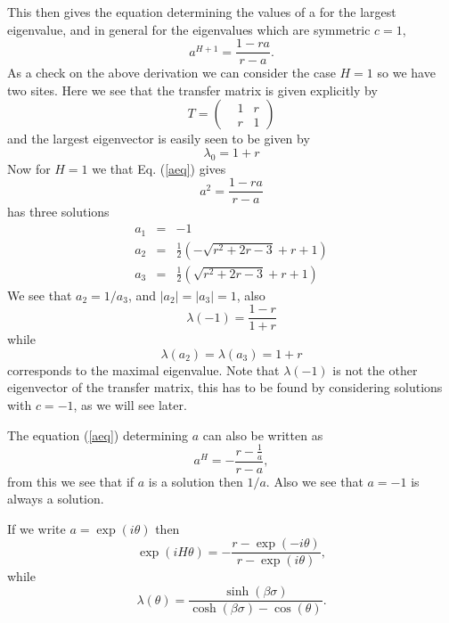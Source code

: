 This then gives the equation determining the values of a for the largest eigenvalue, and in general for the eigenvalues which are symmetric $c=1$,
\begin{equation}
    a^{H+1} =  \frac{1-ra}{r-a}.
    \label{aeq}
\end{equation}
As a check on the above derivation we can consider the case $H=1$ so we have two sites. Here we see that the transfer matrix is given explicitly by
\begin{equation}
    T =\begin{pmatrix} & 1 & r\\& r &1\end{pmatrix}
\end{equation}
and the largest eigenvector is easily seen to be given by
\begin{equation}
    \lambda_0 = 1+r 
\end{equation}
Now for $H=1$ we that Eq. (\ref{aeq}) gives
\begin{equation}
    a^{2} =  \frac{1-ra}{r-a}
\end{equation}
has three solutions
\begin{eqnarray}
a_1&=& -1\\
a_2&=& \frac{1}{2} \left(-\sqrt{r^2+2
   r-3}+r+1\right)    \\
a_3&=& \frac{1}{2} \left(\sqrt{r^2+2
   r-3}+r+1\right)\end{eqnarray}
We see that $a_2=1/a_3$, and $|a_2|=|a_3|=1$, also
\begin{equation}
    \lambda(-1)= \frac{1-r}{1+r}
\end{equation}
while 
\begin{equation}
    \lambda(a_2)=\lambda(a_3)= 1+r
\end{equation}
corresponds to the maximal eigenvalue. Note that $\lambda(-1)$ is not the other  eigenvector of the transfer matrix, this has to be found by considering solutions with $c=-1$, as we will see later.

The equation  (\ref{aeq}) determining $a$ can also be written as
\begin{equation}
    a^{H} = - \frac{r-\frac{1}{a}}{r-a},
\end{equation}
from this we see that if $a$ is a solution then $1/a$. Also we see that $a=-1$ is always a solution.

If we write $a=\exp(i\theta)$ then 
\begin{equation}
    \exp(iH\theta) = - \frac{r-\exp(-i\theta)}{r-\exp(i\theta)},\label{thetamas}
\end{equation}
while
\begin{equation}
    \lambda(\theta) = \frac{\sinh(\beta\sigma)}{\cosh(\beta\sigma) - \cos(\theta)}.
\end{equation}

